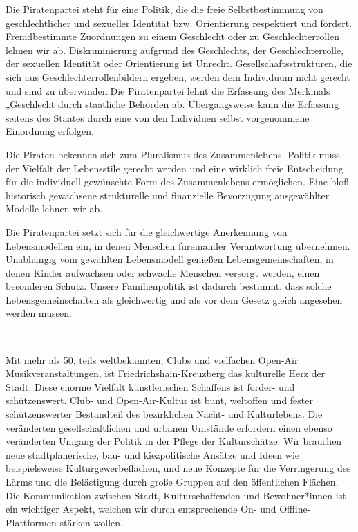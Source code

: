 \documentclass[a4paper,10pt]{article}
\newcommand{\mysection}[1]{{\vspace{1cm}\noindent\color{gray}{\ttfamily\LARGE\raggedright #1}\\\medskip}}
\begin{document}
\enlargethispage{-1em}
Die Piratenpartei steht für eine Politik, die die freie Selbstbestimmung
von geschlechtlicher und sexueller Identität bzw. Orientierung
respektiert und fördert. Fremdbestimmte Zuordnungen zu einem Geschlecht
oder zu Geschlechterrollen lehnen wir ab. Diskriminierung aufgrund des
Geschlechts, der Geschlechterrolle, der sexuellen Identität oder
Orientierung ist Unrecht. Gesellschaftsstrukturen, die sich aus
Geschlechterrollenbildern ergeben, werden dem Individuum nicht gerecht
und sind zu überwinden.Die Piratenpartei lehnt die Erfassung des
Merkmals „Geschlecht{\grqq} durch staatliche Behörden ab. Übergangsweise kann
die Erfassung seitens des Staates durch eine von den Individuen selbst
vorgenommene Einordnung erfolgen.

Die Piraten bekennen sich zum Pluralismus des Zusammenlebens. Politik
muss der Vielfalt der Lebensstile gerecht werden und eine wirklich freie
Entscheidung für die individuell gewünschte Form des Zusammenlebens
ermöglichen. Eine bloß historisch gewachsene strukturelle und
finanzielle Bevorzugung ausgewählter Modelle lehnen wir ab.

Die Piratenpartei setzt sich für die gleichwertige Anerkennung von
Lebensmodellen ein, in denen Menschen füreinander Verantwortung
übernehmen. Unabhängig vom gewählten Lebensmodell genießen
Lebensgemeinschaften, in denen Kinder aufwachsen oder schwache Menschen
versorgt werden, einen besonderen Schutz. Unsere Familienpolitik ist
dadurch bestimmt, dass solche Lebensgemeinschaften als gleichwertig und
als vor dem Gesetz gleich angesehen werden müssen.


\mysection{Kultur}

Mit mehr als 50, teils weltbekannten, Clubs und vielfachen Open-Air
Musikveranstaltungen, ist Friedrichshain-Kreuzberg das kulturelle Herz
der Stadt. Diese enorme Vielfalt künstlerischen Schaffens ist förder-
und schützenswert. Club- und Open-Air-Kultur ist bunt, weltoffen und
fester schützenswerter Bestandteil des bezirklichen Nacht- und
Kulturlebens. Die veränderten gesellschaftlichen und urbanen Umstände
erfordern einen ebenso veränderten Umgang der Politik in der Pflege der
Kulturschätze. Wir brauchen neue stadtplanerische, bau- und
kiezpolitische Ansätze und Ideen wie beispielsweise
Kulturgewerbeflächen, und neue Konzepte für die Verringerung des Lärms
und die Belästigung durch große Gruppen auf den öffentlichen Flächen.
Die Kommunikation zwischen Stadt, Kulturschaffenden und Bewohner*innen
ist ein wichtiger Aspekt, welchen wir durch entsprechende On- und
Offline-Plattformen stärken wollen.
\end{document}
